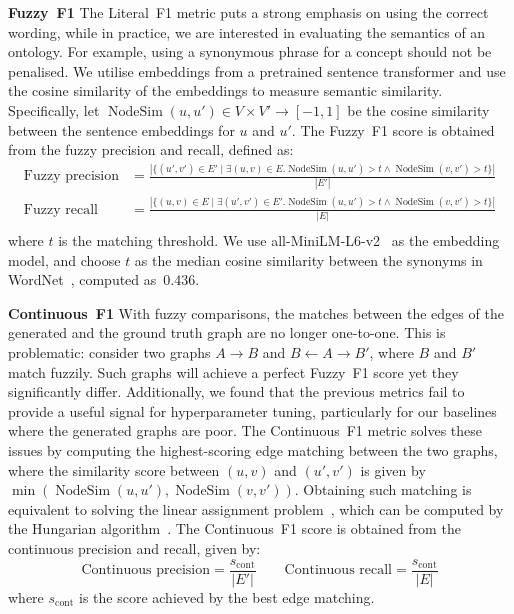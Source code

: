 \documentclass{article}
\DeclareMathOperator{\nodesim}{NodeSim}
\begin{document}
\textbf{Fuzzy~F1 }
The Literal~F1 metric puts a strong emphasis on using the correct wording, while in practice, we are interested in evaluating the semantics of an ontology. For example, using a synonymous phrase for a concept should not be penalised. We utilise embeddings from a pretrained sentence transformer \cite{reimers-2019-sentence-bert} and use the cosine similarity of the embeddings to measure semantic similarity. Specifically, let $\nodesim(u, u') \in V \times V' \to [-1, 1]$ be the cosine similarity between the sentence embeddings for $u$ and $u'$. The Fuzzy~F1 score is obtained from the fuzzy precision and recall, defined as:
\begin{equation*}
    \begin{aligned}
        \text{Fuzzy precision} & = \frac{|
            \{(u', v') \in E' \mid \exists (u, v) \in E.
            \nodesim(u, u') > t \land \nodesim(v, v') > t
            \}
        |}{|E'|}                           \\
        \text{Fuzzy recall}    & = \frac{|
            \{(u, v) \in E \mid \exists (u', v') \in E'.
            \nodesim(u, u') > t \land \nodesim(v, v') > t
            \}
        |}{|E|}                            \\
    \end{aligned}
\end{equation*}
where $t$ is the matching threshold. We use all-MiniLM-L6-v2~\cite{wang2020minilm,reimers-2019-sentence-bert} as the embedding model, and choose $t$ as the median cosine similarity between the synonyms in WordNet~\cite{miller1995wordnet}, computed as~0.436.

\textbf{Continuous~F1 }
With fuzzy comparisons, the matches between the edges of the generated and the ground truth graph are no longer one-to-one. This is problematic: consider two graphs $A\!\rightarrow\!B$ and $B\!\leftarrow\!A\!\rightarrow\!B'$, where $B$ and $B'$ match fuzzily. Such graphs will achieve a perfect Fuzzy~F1 score yet they significantly differ. Additionally, we found that the previous metrics fail to provide a useful signal for hyperparameter tuning, particularly for our baselines where the generated graphs are poor. The Continuous~F1 metric solves these issues by computing the highest-scoring edge matching between the two graphs, where the similarity score between $(u, v)$ and $(u', v')$ is given by $\min(\nodesim(u, u'), \nodesim(v, v'))$. Obtaining such matching is equivalent to solving the linear assignment problem~\cite{martello1987linear}, which can be computed by the Hungarian algorithm~\cite{kuhn1955hungarian}. The Continuous~F1 score is obtained from the continuous precision and recall, given by:
\[
    \text{Continuous precision} = \frac{s_\text{cont}}{|E'|} \qquad
    \text{Continuous recall} = \frac{s_\text{cont}}{|E|}
\]
where $s_\text{cont}$ is the score achieved by the best edge matching.
\end{document}
